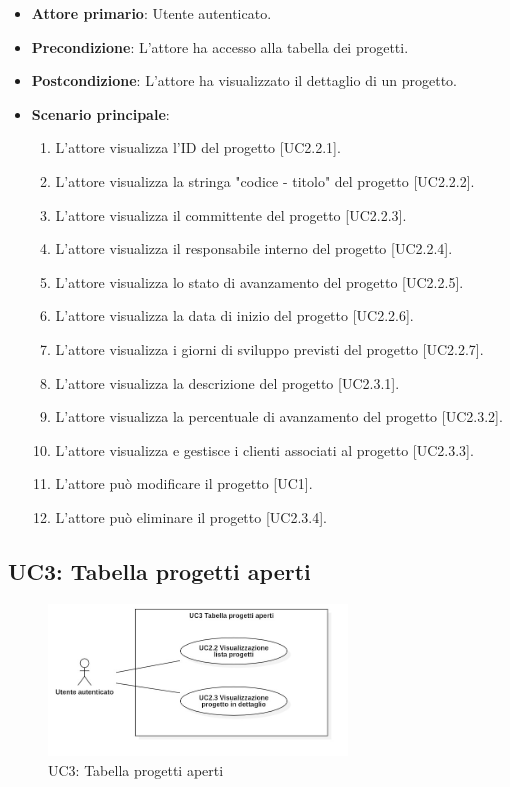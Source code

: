 \begin{itemize}
\item \textbf{Attore primario}: Utente autenticato.
\item \textbf{Precondizione}: L'attore ha accesso alla tabella dei progetti.
\item \textbf{Postcondizione}: L'attore ha visualizzato il dettaglio di un progetto.
\item \textbf{Scenario principale}: 
\begin{enumerate}
\item L'attore visualizza l'ID del progetto [UC2.2.1].
\item L'attore visualizza la stringa "codice - titolo" del progetto [UC2.2.2].
\item L'attore visualizza il committente del progetto [UC2.2.3].
\item L'attore visualizza il responsabile interno del progetto [UC2.2.4].
\item L'attore visualizza lo stato di avanzamento del progetto [UC2.2.5].
\item L'attore visualizza la data di inizio del progetto [UC2.2.6].
\item L'attore visualizza i giorni di sviluppo previsti del progetto [UC2.2.7].
\item L'attore visualizza la descrizione del progetto [UC2.3.1].
\item L'attore visualizza la percentuale di avanzamento del progetto [UC2.3.2].
\item L'attore visualizza e gestisce i clienti associati al progetto [UC2.3.3].
\item L'attore può modificare il progetto [UC1].
\item L'attore può eliminare il progetto [UC2.3.4].
\end{enumerate}
\end{itemize}

\subsection{UC3: Tabella progetti aperti}
\begin{figure}[!h]
\centering
\includegraphics[width=300px]{../images/UC/.jpeg/UC3.0-tabellaProgettiAperti.jpg}
\caption{UC3: Tabella progetti aperti}
\end{figure}

